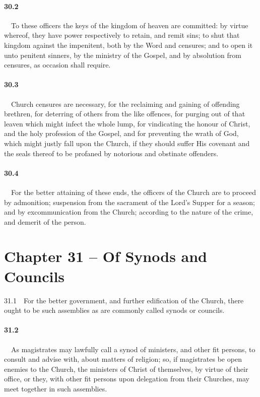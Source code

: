 \paragraph{30.2}\ \ To these officers the keys of the kingdom of heaven are committed: by virtue whereof, they have power respectively to retain, and remit sins; to shut that kingdom against the impenitent, both by the Word and censures; and to open it unto penitent sinners, by the ministry of the Gospel, and by absolution from censures, as occasion shall require.   
\bigskip
\paragraph{30.3}\ \ Church censures are necessary, for the reclaiming and gaining of offending brethren, for deterring of others from the like offences, for purging out of that leaven which might infect the whole lump, for vindicating the honour of Christ, and the holy profession of the Gospel, and for preventing the wrath of God, which might justly fall upon the Church, if they should suffer His covenant and the seals thereof to be profaned by notorious and obstinate offenders.   
\bigskip
\paragraph{30.4}\ \ For the better attaining of these ends, the officers of the Church are to proceed by admonition; suspension from the sacrament of the Lord's Supper for a season; and by excommunication from the Church; according to the nature of the crime, and demerit of the person.  

\section{Chapter 31 -- Of Synods and Councils} 31.1\ \ For the better government, and further edification of the Church, there ought to be such assemblies as are commonly called synods or councils.   
\bigskip
\paragraph{31.2}\ \ As magistrates may lawfully call a synod of ministers, and other fit persons, to consult and advise with, about matters of religion; so, if magistrates be open enemies to the Church, the ministers of Christ of themselves, by virtue of their office, or they, with other fit persons upon delegation from their Churches, may meet together in such assemblies.
\bigskip
